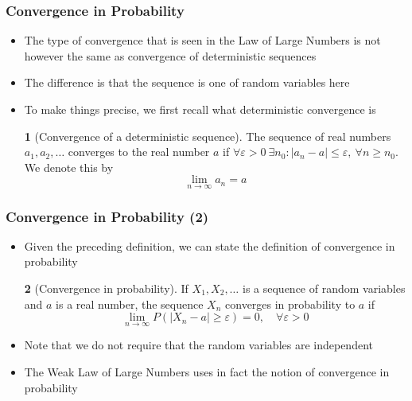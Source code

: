 \documentclass[10pt]{beamer}
\theoremstyle{definition}
\newtheorem{definition}{\translate{Definition}}
\begin{document}
\begin{frame}[fragile]
	\frametitle{Convergence in Probability}
	\begin{itemize}
		\item The type of convergence that is seen in the Law of Large Numbers is not however the same as convergence of deterministic sequences
		
		\item The difference is that the sequence is one of random variables here
		
		\item To make things precise, we first recall what deterministic convergence is
		\begin{definition}[Convergence of a deterministic sequence]
			The sequence of real numbers $ a_{1}, a_{2}, \ldots $ converges to the real number $ a $ if $ \forall \varepsilon > 0\ \exists n_{0}: |a_{n} - a| \leq \varepsilon,\ \forall n \geq n_{0}$. We denote this by
			\[
				\lim_{n\to\infty}a_{n} = a
			\]
		\end{definition}	
	\end{itemize}
\end{frame}

\begin{frame}[fragile]
	\frametitle{Convergence in Probability (2)}
	\begin{itemize}
		\item Given the preceding definition, we can state the definition of convergence in probability
		\begin{definition}[Convergence in probability]
			If $ X_{1}, X_{2},\ldots $ is a sequence of random variables and $ a $ is a real number, the sequence $ X_{n} $ converges in probability to $ a $ if 
			\[
				\lim_{n\to\infty}P(|X_{n} - a| \geq \varepsilon) = 0,\quad \forall \varepsilon > 0
			\]
		\end{definition}
	
		\item Note that we do not require that the random variables are independent
		
		\item The Weak Law of Large Numbers uses in fact the notion of convergence in probability
	\end{itemize}
\end{frame}
\end{document}
